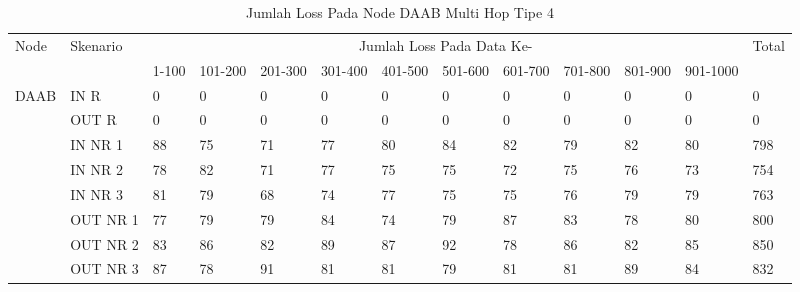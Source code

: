 \begin{table}[H]
  \centering
  \caption{Jumlah Loss Pada Node DAAB Multi Hop Tipe 4}
    \begin{tabular}{|p{1cm}|p{1.9cm}|p{0.6cm}|p{0.6cm}|p{0.6cm}|p{0.6cm}|p{0.6cm}|p{0.6cm}|p{0.6cm}|p{0.6cm}|p{0.6cm}|p{0.6cm}|p{1cm}|}
    \hline
        \multirow{2}{*}{Node}&\multirow{2}{*}{Skenario}&\multicolumn{10}{|c|}{Jumlah Loss Pada Data Ke-}&\multirow{2}{*}{Total} \\\cline{3-12}
          & & 1-100 & 101-200 & 201-300 & 301-400 & 401-500 & 501-600 & 601-700 & 701-800 & 801-900 & 901-1000 & \\
        \hline
    \multirow{8}{*}{DAAB}  
          & IN R  & 0     & 0     & 0     & 0     & 0     & 0     & 0     & 0     & 0     & 0     & 0 \\
          & OUT R & 0     & 0     & 0     & 0     & 0     & 0     & 0     & 0     & 0     & 0     & 0 \\
          & IN NR 1 & 88    & 75    & 71    & 77    & 80    & 84    & 82    & 79    & 82    & 80    & 798 \\
          & IN NR 2 & 78    & 82    & 71    & 77    & 75    & 75    & 72    & 75    & 76    & 73    & 754 \\
          & IN NR 3 & 81    & 79    & 68    & 74    & 77    & 75    & 75    & 76    & 79    & 79    & 763 \\
          & OUT NR 1 & 77    & 79    & 79    & 84    & 74    & 79    & 87    & 83    & 78    & 80    & 800 \\
          & OUT NR 2 & 83    & 86    & 82    & 89    & 87    & 92    & 78    & 86    & 82    & 85    & 850 \\
          & OUT NR 3 & 87    & 78    & 91    & 81    & 81    & 79    & 81    & 81    & 89    & 84    & 832 \\
    
    \hline
    \end{tabular}%
  \label{tab:addlabel}%
\end{table}%

